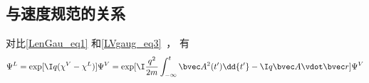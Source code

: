 \subsection{与速度规范的关系}
对比\autoref{LenGau_eq1} 和\autoref{LVgaug_eq3}~， 有
\begin{equation}\label{LenGau_eq3}
\Psi^L = \exp[\I q(\chi^V - \chi^L)]\Psi^V = \exp[\I\frac{q^2}{2m}\int_{-\infty}^t \bvec A^2(t')\dd{t'} - \I q \bvec A\vdot \bvec r] \Psi^V
\end{equation}
